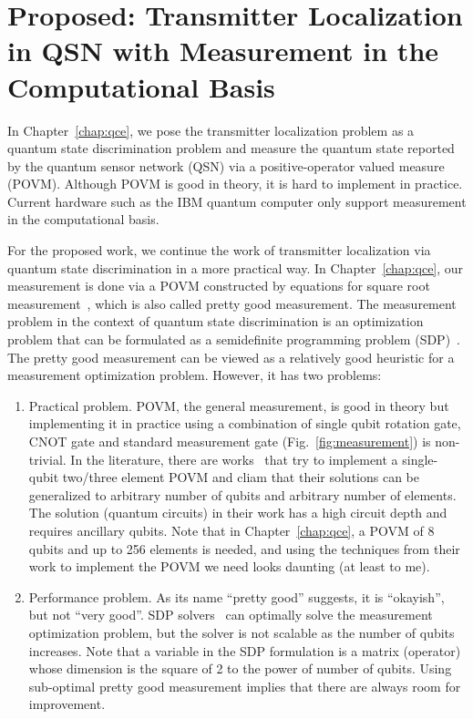\chapter{Proposed: Transmitter Localization in QSN with Measurement in the Computational Basis}
\label{chap:proposed}

In Chapter~\ref{chap:qce}, we pose the transmitter localization problem as a quantum state discrimination problem
and measure the quantum state reported by the quantum sensor network (QSN) via a positive-operator valued measure (POVM).
Although POVM is good in theory, it is hard to implement in practice.
Current hardware such as the IBM quantum computer only support measurement in the computational basis.

For the proposed work, we continue the work of transmitter localization via quantum state discrimination in a more practical way.
In Chapter~\ref{chap:qce}, our measurement is done via a POVM constructed by equations for square root measurement~\cite{prettygood},
which is also called pretty good measurement. The measurement problem in the context of quantum state discrimination is an optimization problem
that can be formulated as a semidefinite programming problem (SDP)~\cite{semidefinite}. 
The pretty good measurement can be viewed as a relatively good heuristic for a measurement optimization problem.
However, it has two problems:
\begin{enumerate}
    \item Practical problem. POVM, the general measurement, is good in theory but implementing it in practice using a combination of
          single qubit rotation gate, CNOT gate and standard measurement gate (Fig.~\ref{fig:measurement}) is non-trivial. 
          In the literature, there are works~\cite{pra19-povm,PhysRevResearch.povm} that try to implement a single-qubit two/three element POVM and cliam
          that their solutions can be generalized to arbitrary number of qubits and arbitrary number of elements. 
          The solution (quantum circuits) in their work has a high circuit depth and requires ancillary qubits.
          Note that in Chapter~\ref{chap:qce}, a POVM of 8 qubits and up to 256 elements is needed, and using the 
          techniques from their work to implement the POVM we need looks daunting (at least to me).
          
    \item Performance problem. As its name ``pretty good'' suggests, it is ``okayish'', but not ``very good''.
          SDP solvers~\cite{diamond2016cvxpy} can optimally solve the measurement optimization problem,
          but the solver is not scalable as the number of qubits increases. 
          Note that a variable in the SDP formulation is a matrix (operator) whose dimension is the square of 2 to the power of number of qubits.
          Using sub-optimal pretty good measurement implies that there are always room for improvement.
\end{enumerate}

